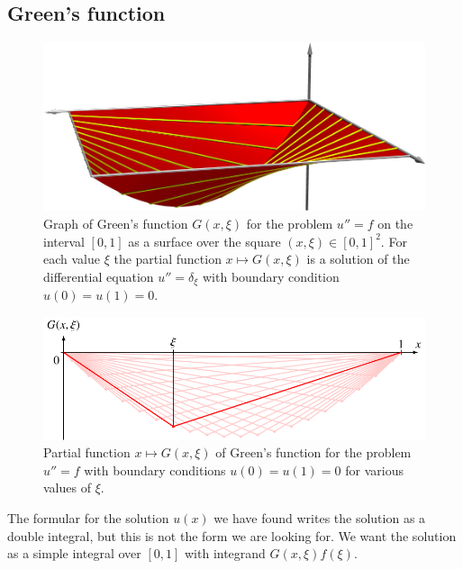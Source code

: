 \subsection{Green's function}
\begin{figure}
\begin{center}
\includegraphics[width=\hsize]{../common/3d/green.jpg}
\end{center}
\caption{Graph of Green's function $G(x,\xi)$ for the problem $u''=f$ 
on the interval $[0,1]$ as a surface over the square $(x,\xi)\in[0,1]^2$.
For each value $\xi$ the partial function
$x\mapsto G(x,\xi)$ is a solution of the differential equation
$u''=\delta_\xi$ with boundary condition $u(0)=u(1)=0$.
\label{elliptisch:green3dflaeche}}
\end{figure}
\begin{figure}
\begin{center}
\includegraphics{7-elliptic/images/green.pdf}
\end{center}
\caption{Partial function $x\mapsto G(x,\xi)$ of Green's function
for the problem $u''=f$ with boundary conditions 
$u(0)=u(1)=0$ for various values of $\xi$.
\label{elliptisch:green1schar}}
\end{figure}

The formular for the solution $u(x)$ we have found writes the solution
as a double integral, but this is not the form we are looking for.
We want the solution as a simple integral over $[0,1]$ with integrand
$G(x,\xi) f(\xi)$.

